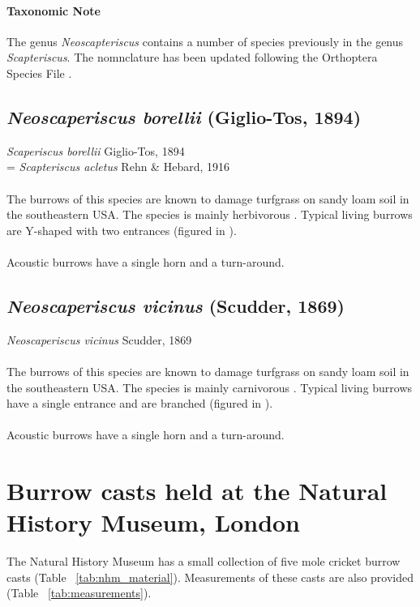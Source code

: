 \documentclass{article}
\begin{document}
   \paragraph{Taxonomic Note}
   The genus \textit{Neoscapteriscus} contains a number of species previously in the genus \textit{Scapteriscus}. The nomnclature has been updated following the Orthoptera Species File \cite{eades2016}.
   
   \subsection{\textit{Neoscaperiscus borellii} (Giglio-Tos, 1894) \cite{giglio-tos1894}}
   \textit{Scaperiscus borellii} Giglio-Tos, 1894\\
   = \textit{Scapteriscus acletus} Rehn \& Hebard, 1916
   \paragraph{}
   The burrows of this species are known to damage turfgrass on sandy loam soil in the  southeastern USA. The species is mainly herbivorous \cite{brandenburg2002}. Typical living  burrows are Y-shaped with two entrances (figured in \cite{brandenburg2002}).
   \paragraph{}
   Acoustic burrows have a single horn and a turn-around.
   
   \subsection{\textit{Neoscaperiscus vicinus} (Scudder, 1869) \cite{scudder1869}}
   \textit{Neoscaperiscus vicinus} Scudder, 1869
   \paragraph{}
   The burrows of this species are known to damage turfgrass on sandy loam soil in the southeastern USA. The species is mainly carnivorous \cite{brandenburg2002}. Typical living burrows have a single entrance and are branched (figured in \cite{brandenburg2002}).
   \paragraph{}
   Acoustic burrows have a single horn and a turn-around.
   
   \section{Burrow casts held at the Natural History Museum, London}
   The Natural History Museum has a small collection of five mole cricket burrow casts (Table ~\ref{tab:nhm_material}). Measurements of these casts are also provided (Table ~\ref{tab:measurements}).
   
\end{document}
